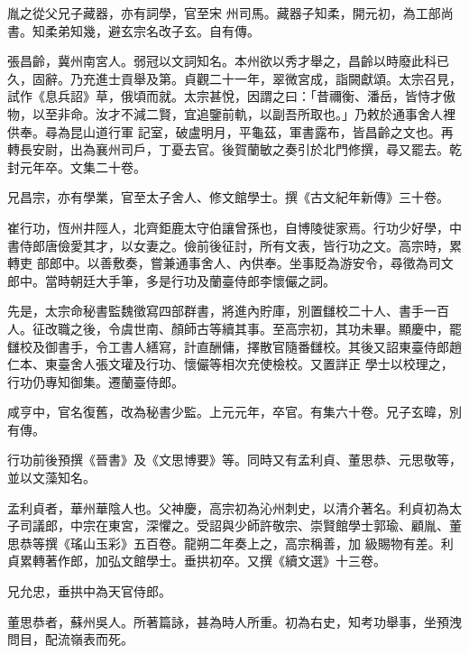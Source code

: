 \begin{pinyinscope}
 胤之從父兄子藏器，亦有詞學，官至宋
 州司馬。藏器子知柔，開元初，為工部尚書。知柔弟知幾，避玄宗名改子玄。自有傳。



 張昌齡，冀州南宮人。弱冠以文詞知名。本州欲以秀才舉之，昌齡以時廢此科已久，固辭。乃充進士貢舉及第。貞觀二十一年，翠微宮成，詣闕獻頌。太宗召見，試作《息兵詔》草，俄頃而就。太宗甚悅，因謂之曰：「昔禰衡、潘岳，皆恃才傲物，以至非命。汝才不減二賢，宜追鑒前軌，以副吾所取也。」乃敕於通事舍人裡供奉。尋為昆山道行軍
 記室，破盧明月，平龜茲，軍書露布，皆昌齡之文也。再轉長安尉，出為襄州司戶，丁憂去官。後賀蘭敏之奏引於北門修撰，尋又罷去。乾封元年卒。文集二十卷。



 兄昌宗，亦有學業，官至太子舍人、修文館學士。撰《古文紀年新傳》三十卷。



 崔行功，恆州井陘人，北齊鉅鹿太守伯讓曾孫也，自博陵徙家焉。行功少好學，中書侍郎唐儉愛其才，以女妻之。儉前後征討，所有文表，皆行功之文。高宗時，累轉吏
 部郎中。以善敷奏，嘗兼通事舍人、內供奉。坐事貶為游安令，尋徵為司文郎中。當時朝廷大手筆，多是行功及蘭臺侍郎李懷儼之詞。



 先是，太宗命秘書監魏徵寫四部群書，將進內貯庫，別置讎校二十人、書手一百人。征改職之後，令虞世南、顏師古等續其事。至高宗初，其功未畢。顯慶中，罷讎校及御書手，令工書人繕寫，計直酬傭，擇散官隨番讎校。其後又詔東臺侍郎趙仁本、東臺舍人張文瓘及行功、懷儼等相次充使檢校。又置詳正
 學士以校理之，行功仍專知御集。遷蘭臺侍郎。



 咸亨中，官名復舊，改為秘書少監。上元元年，卒官。有集六十卷。兄子玄暐，別有傳。



 行功前後預撰《晉書》及《文思博要》等。同時又有孟利貞、董思恭、元思敬等，並以文藻知名。



 孟利貞者，華州華陰人也。父神慶，高宗初為沁州刺史，以清介著名。利貞初為太子司議郎，中宗在東宮，深懼之。受詔與少師許敬宗、崇賢館學士郭瑜、顧胤、董思恭等撰《瑤山玉彩》五百卷。龍朔二年奏上之，高宗稱善，加
 級賜物有差。利貞累轉著作郎，加弘文館學士。垂拱初卒。又撰《續文選》十三卷。



 兄允忠，垂拱中為天官侍郎。



 董思恭者，蘇州吳人。所著篇詠，甚為時人所重。初為右史，知考功舉事，坐預洩問目，配流嶺表而死。




\end{pinyinscope}
